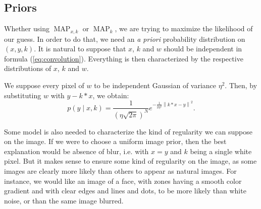 \documentclass[english,a4paper]{article}
\theoremstyle{plain}
\theoremstyle{definition}
\theoremstyle{remark}
\DeclareMathOperator{\MAP}{MAP}
\newcommand{\norm}[1]{\left\lVert #1 \right\rVert}
\begin{document}
\subsection{Priors}

Whether using $\MAP_{x,k}$ or $\MAP_k$, we are trying to maximize the likelihood of our guess. In order to do that, we need an \emph{a priori} probability distribution on $(x,y,k)$.
It is natural to suppose that $x$, $k$ and $w$ should be independent in formula (\ref{eq:convolution}). Everything is then characterized by the respective distributions of $x$, $k$ and $w$.

We suppose every pixel of $w$ to be independent Gaussian of variance $\eta^2$. Then, by substituting $w$ with $y-k*x$, we obtain:
\begin{equation}\label{eq:p_y|x,k}
p(y\mid x,k) = \frac{1}{(\eta\sqrt{2\pi})^N} e^{-\frac{1}{2\eta^2}\norm{k*x-y}^2} .
\end{equation}

Some model is also needed to characterize the kind of regularity we can suppose on the image.
If we were to choose a uniform image prior, then the best explanation would be absence of blur, i.e. with $x = y$ and $k$ being a single white pixel. But it makes sense to ensure some kind of regularity on the image, as some images are clearly more likely than others to appear as natural images.
For instance, we would like an image of a face, with zones having a smooth color gradient and with clear edges and lines and dots, to be more likely than white noise, or than the same image blurred.
\end{document}
